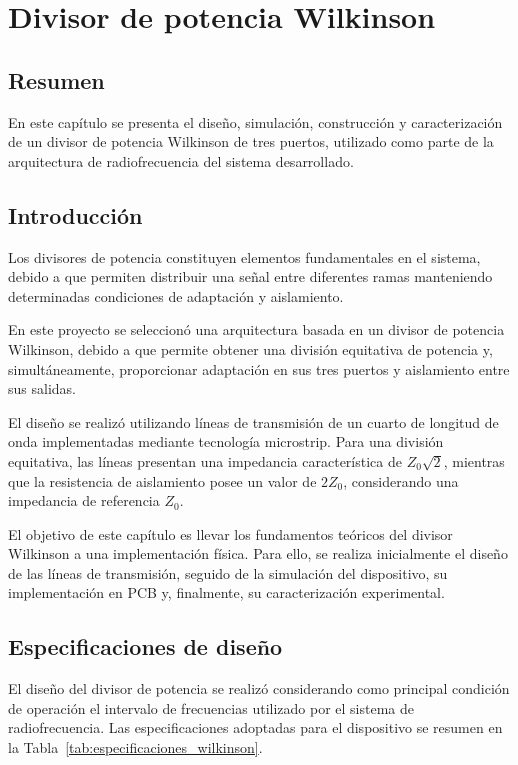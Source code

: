 \chapter{Divisor de potencia Wilkinson}

\section*{Resumen}

En este capítulo se presenta el diseño, simulación, construcción y caracterización de un divisor de potencia Wilkinson de tres puertos, utilizado como parte de la arquitectura de radiofrecuencia del sistema desarrollado.

\section{Introducción}

Los divisores de potencia constituyen elementos fundamentales en el sistema, debido a que permiten distribuir una señal entre diferentes ramas manteniendo determinadas condiciones de adaptación y aislamiento.

En este proyecto se seleccionó una arquitectura basada en un divisor de potencia Wilkinson, debido a que permite obtener una división equitativa de potencia y, simultáneamente, proporcionar adaptación en sus tres puertos y aislamiento entre sus salidas.

El diseño se realizó utilizando líneas de transmisión de un cuarto de longitud de onda implementadas mediante tecnología microstrip. Para una división equitativa, las líneas presentan una impedancia característica de $Z_0\sqrt{2}$, mientras que la resistencia de aislamiento posee un valor de $2Z_0$, considerando una impedancia de referencia $Z_0$.

El objetivo de este capítulo es llevar los fundamentos teóricos del divisor Wilkinson a una implementación física. Para ello, se realiza inicialmente el diseño de las líneas de transmisión, seguido de la simulación del dispositivo, su implementación en PCB y, finalmente, su caracterización experimental.

\section{Especificaciones de diseño}

El diseño del divisor de potencia se realizó considerando como principal condición de operación el intervalo de frecuencias utilizado por el sistema de radiofrecuencia. Las especificaciones adoptadas para el dispositivo se resumen en la Tabla~\ref{tab:especificaciones_wilkinson}.

